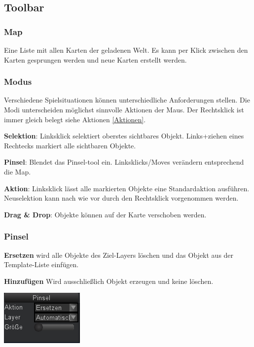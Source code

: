 \documentclass[german,10pt,a4paper,twocolumn,colorscheme=darkblue]{orarticle}
\begin{document}
		\subsection{Toolbar}
		\subsubsection*{Map}
			Eine Liste mit allen Karten der geladenen Welt. Es kann per Klick zwischen den Karten gesprungen werden und neue Karten erstellt werden.
		\subsubsection*{Modus}
			Verschiedene Spielsituationen können unterschiedliche Anforderungen stellen. Die Modi unterscheiden möglichst sinnvolle Aktionen der Maus. Der Rechtsklick ist immer gleich belegt siehe Aktionen \ref{Aktionen}.
			
			\textbf{Selektion}: Linksklick selektiert oberstes sichtbares Objekt. Links+ziehen eines Rechtecks markiert alle sichtbaren Objekte.
			
			\textbf{Pinsel}: Blendet das Pinsel-tool ein. Linksklicks/Moves verändern entsprechend die Map.
			
			\textbf{Aktion}: Linksklick lässt alle markierten Objekte eine Standardaktion ausführen. Neuselektion kann nach wie vor durch den Rechtsklick vorgenommen werden.
			
			\textbf{Drag \& Drop}: Objekte können auf der Karte verschoben werden.
						
		\subsubsection*{Pinsel}
			\begin{minipage}{0.49\linewidth}
			\textbf{Ersetzen} wird alle Objekte des Ziel-Layers löschen und das Objekt aus der Template-Liste einfügen.
			
			\textbf{Hinzufügen} Wird ausschließlich Objekt erzeugen und keine löschen.
			
			\end{minipage}\hspace{1em}
			\begin{minipage}{0.45\linewidth}
				\includegraphics[width=1.0\linewidth]{img/brush}
			\end{minipage}
			
\end{document}
